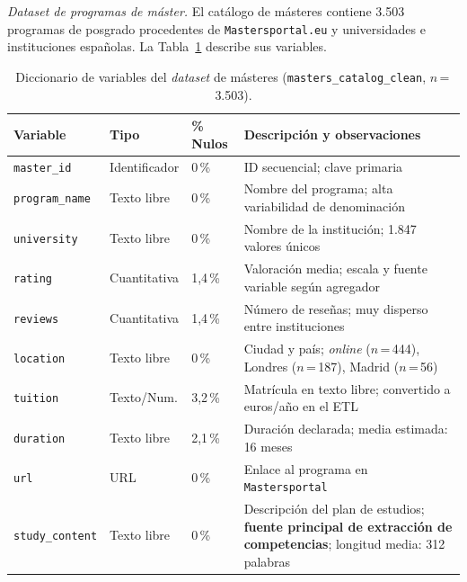 \textit{Dataset de programas de máster.} El catálogo de másteres contiene 3.503 programas de posgrado procedentes de \texttt{Mastersportal.eu} y universidades e instituciones españolas. La Tabla~\ref{tab:vars_masters} describe sus variables.

\begin{table}[H]
  \caption{Diccionario de variables del \textit{dataset} de másteres (\texttt{masters\_catalog\_clean}, $n$\,=\,3.503).}
  \label{tab:vars_masters}
  \centering
  \footnotesize
  \begin{tabular}{|p{3.5cm}|p{2.2cm}|p{1.5cm}|p{7.0cm}|}
    \hline
    \rowcolor{gray!15}
    \textbf{Variable} & \textbf{Tipo} & \textbf{\% Nulos} & \textbf{Descripción y observaciones} \\
    \hline
    \texttt{master\_id}     & Identificador  & 0\,\%   & ID secuencial; clave primaria \\
    \hline
    \texttt{program\_name}  & Texto libre    & 0\,\%   & Nombre del programa; alta variabilidad de denominación \\
    \hline
    \texttt{university}     & Texto libre    & 0\,\%   & Nombre de la institución; 1.847 valores únicos \\
    \hline
    \texttt{rating}         & Cuantitativa   & 1,4\,\% & Valoración media; escala y fuente variable según agregador \\
    \hline
    \texttt{reviews}        & Cuantitativa   & 1,4\,\% & Número de reseñas; muy disperso entre instituciones \\
    \hline
    \texttt{location}       & Texto libre    & 0\,\%   & Ciudad y país; \textit{online} ($n$\,=\,444), Londres ($n$\,=\,187), Madrid ($n$\,=\,56) \\
    \hline
    \texttt{tuition}        & Texto/Num.     & 3,2\,\% & Matrícula en texto libre; convertido a euros/año en el ETL \\
    \hline
    \texttt{duration}       & Texto libre    & 2,1\,\% & Duración declarada; media estimada: 16 meses \\
    \hline
    \texttt{url}            & URL            & 0\,\%   & Enlace al programa en \texttt{Mastersportal} \\
    \hline
    \texttt{study\_content} & Texto libre    & 0\,\%   & Descripción del plan de estudios; \textbf{fuente principal de extracción de competencias}; longitud media: 312 palabras \\
    \hline
  \end{tabular}
\end{table}

